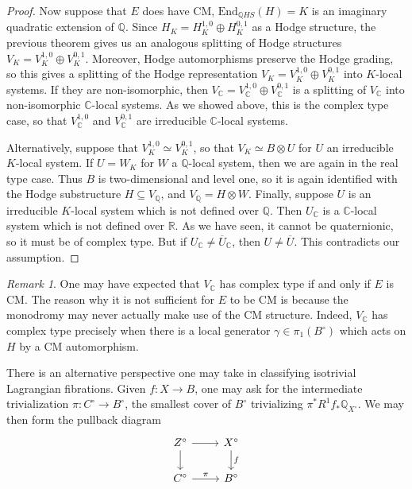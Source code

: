 \documentclass[12pt]{amsart}
\newcommand{\R}{\mathbb{R}}
\newcommand{\Q}{\mathbb{Q}}
\newcommand{\C}{\mathbb{C}}
\newcommand{\End}{\text{End}}
\theoremstyle{definition}
\theoremstyle{remark}
\newtheorem{remark}[theorem]{Remark}
\numberwithin{equation}{section}
\begin{document}
\begin{proof}
Now suppose that \(E\) does have CM, \(\End_{\Q HS}(H) = K\) is an imaginary 
quadratic extension of \(\Q\). Since \(H_K = H_K^{1,0} \oplus H_K^{0,1}\) as a 
Hodge structure, the previous theorem gives us an analogous splitting of 
Hodge structures \(V_K = V_K^{1,0} \oplus V_K^{0,1}\). Moreover, Hodge automorphisms 
preserve the Hodge grading, so this gives a splitting of the Hodge representation 
\(V_K = V_K^{1,0} \oplus V_K^{0,1}\) into \(K\)-local systems. If they are 
non-isomorphic, then \(V_\C = V_\C^{1,0} \oplus V_\C^{0,1}\) is a splitting of 
\(V_\C\) into non-isomorphic \(\C\)-local systems. As we showed above, 
this is the complex type case, so that \(V_\C^{1,0}\) and \(V_\C^{0,1}\) are 
irreducible \(\C\)-local systems. 

Alternatively, suppose that \(V_K^{1,0} \simeq V_K^{0,1}\), so that 
\(V_K \simeq B \otimes U\) for \(U\) an irreducible \(K\)-local system.
If \(U = W_K\) for \(W\) a \(\Q\)-local system, then we are again in the real type
case. Thus \(B\) is two-dimensional and level one, so it is again identified 
with the Hodge substructure \(H \subseteq V_\Q\), and \(V_\Q = H \otimes W\).
Finally, suppose \(U\) is an irreducible \(K\)-local system which is not defined
over \(\Q\). Then \(U_\C\) is a \(\C\)-local system which is not defined 
over \(\R\). As we have seen, it cannot be quaternionic, so it must be of 
complex type. But if \(U_\C \neq \overline{U}_\C\), then \(U \neq \overline{U}\).
This contradicts our assumption.
\end{proof}

\begin{remark}
One may have expected that \(V_\C\) has complex type if and only if \(E\) is CM. 
The reason why it is not sufficient for \(E\) to be CM is because the monodromy 
may never actually make use of the CM structure. Indeed, \(V_\C\) has complex type
precisely when there is a local generator \(\gamma \in \pi_1(B^\circ)\) which
acts on \(H\) by a CM automorphism.
\end{remark}




There is an alternative perspective one may take in classifying isotrivial Lagrangian
fibrations. Given $f: X \to B$, one may ask for the intermediate trivialization
$\pi: C^\circ \to B^\circ$, the smallest cover of $B^\circ$ trivializing
$\pi^* R^1 f_*\Q_{X^\circ}$. We may then form the pullback
diagram
\begin{equation*}
\begin{tikzcd}
	Z^\circ \arrow{r} \arrow{d} & X^\circ \arrow{d}{f} \\
	C^\circ \arrow{r}{\pi} & B^\circ
\end{tikzcd}
\end{equation*}
\end{document}
